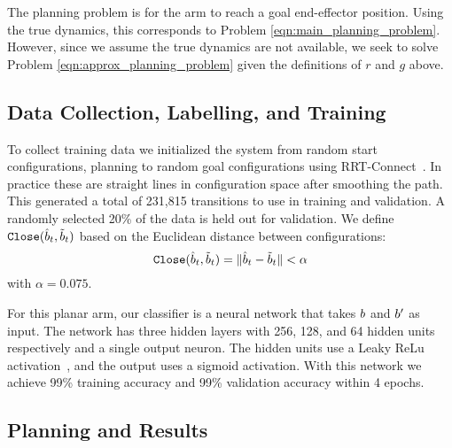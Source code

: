 The planning problem is for the arm to reach a goal end-effector position. Using the true dynamics, this corresponds to Problem \eqref{eqn:main_planning_problem}. However, since we assume the true dynamics are not available, we seek to solve Problem \eqref{eqn:approx_planning_problem} given the definitions of $r$ and $g$ above.


\subsection{Data Collection, Labelling, and Training}

To collect training data we initialized the system from random start configurations, planning to random goal configurations using RRT-Connect~\cite{kuffner2000rrt}. In practice these are straight lines in configuration space after smoothing the path. This generated a total of 231,815 transitions to use in training and validation. A randomly selected 20\% of the data is held out for validation. We define $\texttt{Close}(\hat{b}_t, \tilde{b}_t)$ based on the Euclidean distance between configurations:
\begin{equation}
    \texttt{Close}(\hat{b}_t, \tilde{b}_t) = \| \hat{b}_t - \tilde{b}_t \| < \alpha
\end{equation}
with $\alpha = 0.075$.

For this planar arm, our classifier is a neural network that takes $b$ and $b'$ as input. The network has three hidden layers with 256, 128, and 64 hidden units respectively and a single output neuron. The hidden units use a Leaky ReLu activation~\cite{maas2013rectifier}, and the output uses a sigmoid activation. With this network we achieve 99\% training accuracy and 99\% validation accuracy within 4 epochs.

\subsection{Planning and Results} 

